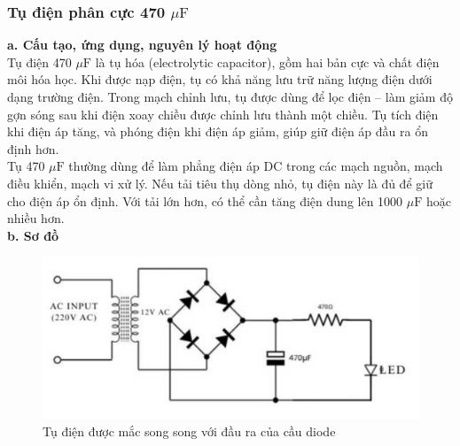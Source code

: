 \documentclass[a4paper,15pt]{article}
\begin{document}
\subsubsection{Tụ điện phân cực 470 $\mu\text{F}$}
\textbf{a. Cấu tạo, ứng dụng, nguyên lý hoạt động} \\
Tụ điện 470 $\mu\text{F}$ là tụ hóa (electrolytic capacitor), gồm hai bản cực và chất điện môi hóa học. Khi được nạp điện, tụ có khả năng lưu trữ năng lượng điện dưới dạng trường điện. Trong 
mạch chỉnh lưu, tụ được dùng để lọc điện – làm giảm độ gợn sóng sau khi điện xoay chiều 
được chỉnh lưu thành một chiều. Tụ tích điện khi điện áp tăng, và phóng điện khi điện áp 
giảm, giúp giữ điện áp đầu ra ổn định hơn. \\
Tụ 470 $\mu\text{F}$ thường dùng để làm phẳng điện áp DC trong các mạch nguồn, mạch điều khiển, 
mạch vi xử lý. Nếu tải tiêu thụ dòng nhỏ, tụ điện này là đủ để giữ cho điện áp ổn định. Với tải lớn hơn, có thể cần tăng điện dung lên 1000 $\mu\text{F}$ hoặc nhiều hơn. \\
\textbf{b. Sơ đồ} \\
\begin{figure}[H]
    \centering
    \includegraphics[scale=0.4]{img/Sodomach.png}
    \caption{Tụ điện được mắc song song với đầu ra của cầu diode}
    \label{fig:enter-label}
\end{figure}
\end{document}
